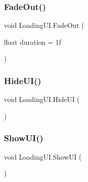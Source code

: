 \subsubsection{\texorpdfstring{FadeOut()}{FadeOut()}}
{\footnotesize\ttfamily void Loading\+U\+I.\+Fade\+Out (\begin{DoxyParamCaption}\item[{float}]{duration = {\ttfamily 1f} }\end{DoxyParamCaption})}

\mbox{\label{class_loading_u_i_a4b195dd7d9b45cbe16506f67e2d8bf10}} 
\subsubsection{\texorpdfstring{HideUI()}{HideUI()}}
{\footnotesize\ttfamily void Loading\+U\+I.\+Hide\+UI (\begin{DoxyParamCaption}{ }\end{DoxyParamCaption})}

\mbox{\label{class_loading_u_i_a117b66becd8ec50738d5bb53395c5638}} 
\subsubsection{\texorpdfstring{ShowUI()}{ShowUI()}}
{\footnotesize\ttfamily void Loading\+U\+I.\+Show\+UI (\begin{DoxyParamCaption}{ }\end{DoxyParamCaption})}

